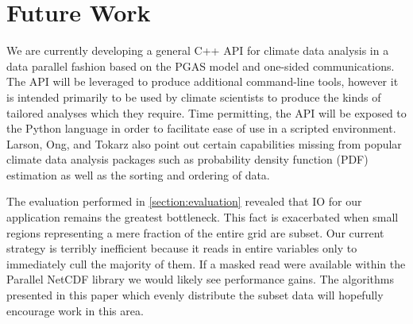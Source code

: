 \section{Future Work}
\label{section:future}

We are currently developing a general C++ API for climate data analysis in a
data parallel fashion based on the PGAS model and one-sided communications.
The API will be leveraged to produce additional command-line tools, however it
is intended primarily to be used by climate scientists to produce the kinds of
tailored analyses which they require.  Time permitting, the API will be
exposed to the Python language in order to facilitate ease of use in a
scripted environment.  Larson, Ong, and Tokarz also point out certain
capabilities missing from popular climate data analysis packages such as
probability density function (PDF) estimation as well as the sorting and
ordering of data.

The evaluation performed in \ref{section:evaluation} revealed that IO for our
application remains the greatest bottleneck.  This fact is exacerbated when
small regions representing a mere fraction of the entire grid are subset.  Our
current strategy is terribly inefficient because it reads in entire variables
only to immediately cull the majority of them.  If a masked read were
available within the Parallel NetCDF library we would likely see performance
gains.  The algorithms presented in this paper which evenly distribute the
subset data will hopefully encourage work in this area.
